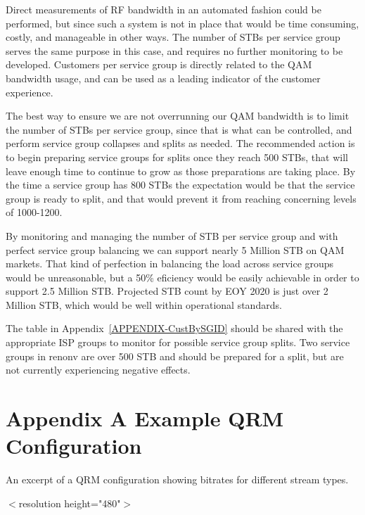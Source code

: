 \documentclass{article}
\begin{document}
Direct measurements of RF bandwidth in an automated fashion could be performed, but since such a system is not in place that would be time consuming, costly, and manageable in other ways. The number of STBs per service group serves the same purpose in this case, and requires no further monitoring to be developed. Customers per service group is directly related to the QAM bandwidth usage, and can be used as a leading indicator of the customer experience. 

The best way to ensure we are not overrunning our QAM bandwidth is to limit the number of STBs per service group, since that is what can be controlled, and perform service group collapses and splits as needed. The recommended action is to begin preparing service groups for splits once they reach 500 STBs, that will leave enough time to continue to grow as those preparations are taking place. By the time a service group has 800 STBs the expectation would be that the service group is ready to split, and that would prevent it from reaching concerning levels of 1000-1200. 

By monitoring and managing the number of STB per service group and with perfect service group balancing we can support nearly 5 Million STB on QAM markets. That kind of perfection in balancing the load across service groups would be unreasonable, but a 50\% eficiency would be easily achievable in order to support 2.5 Million STB. Projected STB count by EOY 2020 is just over 2 Million STB, which would be well within operational standards. 

The table in Appendix~\ref{APPENDIX-CustBySGID} should be shared with the appropriate ISP groups to monitor for possible service group splits. Two service groups in renonv are over 500 STB and should be prepared for a split, but are not currently experiencing negative effects. 



\newpage

\appendix

\section{Appendix A\: Example QRM Configuration}
\label{APPENDIX-QRMConfig}

An excerpt of a QRM configuration showing bitrates for different stream types.  
\newline
\newline

$<$resolution height="480"$>$
\end{document}
